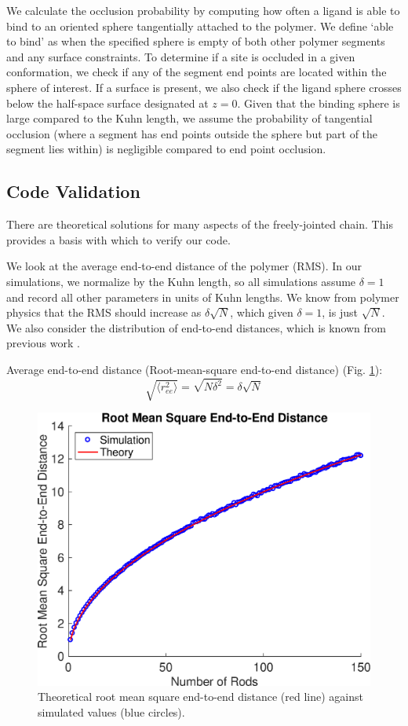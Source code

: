 \documentclass[../AdvancementSummary.tex]{subfiles}
\begin{document}
We calculate the occlusion probability by computing how often a ligand is able to bind to an oriented sphere tangentially attached to the polymer. We define `able to bind' as when the specified sphere is empty of both other polymer segments and any surface constraints. To determine if a site is occluded in a given conformation, we check if any of the segment end points are located within the sphere of interest. If a surface is present, we also check if the ligand sphere crosses below the half-space surface designated at $z=0$. Given that the binding sphere is large compared to the Kuhn length, we assume the probability of tangential occlusion (where a segment has end points outside the sphere but part of the segment lies within) is negligible compared to end point occlusion. 


\subsection{Code Validation}
There are theoretical solutions for many aspects of the freely-jointed chain. This provides a basis with which to verify our code. 

We look at the average end-to-end distance of the polymer (RMS). In our simulations, we normalize by the Kuhn length, so all simulations assume $\delta = 1$ and record all other parameters in units of Kuhn lengths. We know from polymer physics that the RMS should increase as $\delta \sqrt{N}$, which given $\delta = 1$, is just $\sqrt{N}$. We also consider the distribution of end-to-end distances, which is known from previous work \cite{VanValen2009, Reeves2011}.

Average end-to-end distance (Root-mean-square end-to-end distance) \cite{Reeves2011} (Fig. \ref{fig: RMS}):
\begin{equation*}
\sqrt{\langle r_{ee}^2 \rangle} = \sqrt{N\delta^2} = \delta \sqrt{N}
\end{equation*}

\begin{figure}
\begin{center}
\includegraphics[width=0.5\linewidth]{ModelConfirmationFigures/RMSEndtoEnd.eps}
\caption{Theoretical root mean square end-to-end distance (red line) against simulated values (blue circles). \label{fig: RMS}}
\end{center}
\end{figure}
\end{document}
